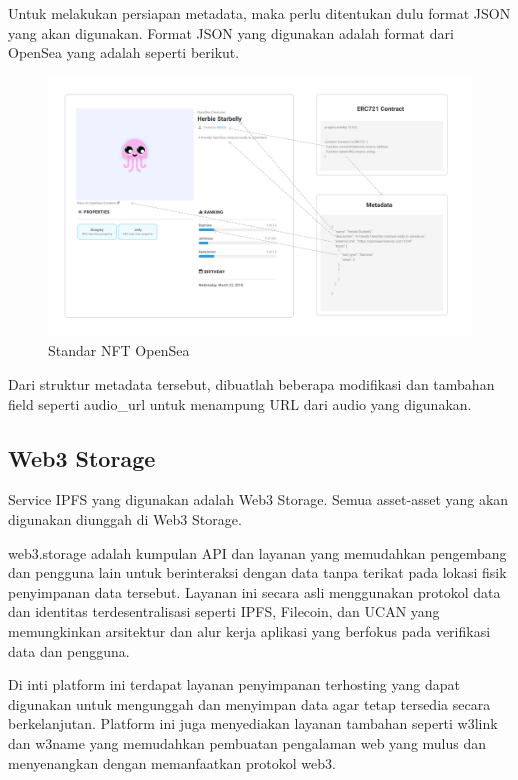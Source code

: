 Untuk melakukan persiapan metadata, maka perlu ditentukan dulu format JSON yang akan digunakan. Format JSON yang digunakan adalah format dari
OpenSea yang adalah seperti berikut.


\begin{figure}[H]
  \centering

  \includegraphics[scale=0.23]{gambar/nft-standards-opensea.png}

  \caption{Standar NFT OpenSea}
  \label{fig:openseanft}
\end{figure}

Dari struktur metadata tersebut, dibuatlah beberapa modifikasi dan tambahan field seperti audio\_url untuk menampung URL dari audio yang digunakan.


\subsection{Web3 Storage}
Service IPFS yang digunakan adalah Web3 Storage. Semua asset-asset yang akan digunakan diunggah di Web3 Storage.

web3.storage adalah kumpulan API dan layanan yang memudahkan pengembang dan pengguna lain untuk berinteraksi dengan data tanpa terikat pada lokasi fisik penyimpanan data tersebut. Layanan ini secara asli menggunakan protokol data dan identitas terdesentralisasi seperti IPFS, Filecoin, dan UCAN yang memungkinkan arsitektur dan alur kerja aplikasi yang berfokus pada verifikasi data dan pengguna.

Di inti platform ini terdapat layanan penyimpanan terhosting yang dapat digunakan untuk mengunggah dan menyimpan data agar tetap tersedia secara berkelanjutan. Platform ini juga menyediakan layanan tambahan seperti w3link dan w3name yang memudahkan pembuatan pengalaman web yang mulus dan menyenangkan dengan memanfaatkan protokol web3.

